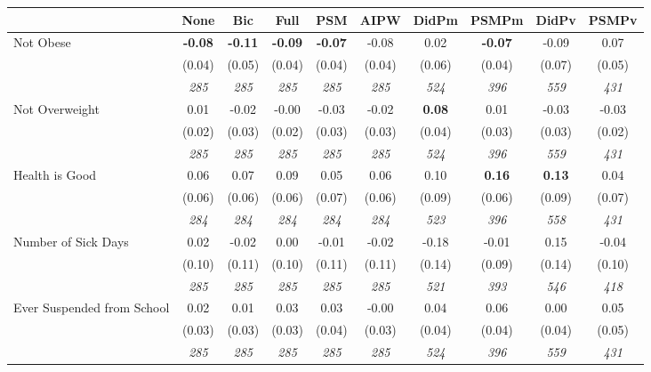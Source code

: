 \begin{tabular}{l c c c c c c c c c}
\toprule
 & None & Bic & Full & PSM & AIPW & DidPm & PSMPm & DidPv & PSMPv \\
\midrule
Not Obese & \textbf{ -0.08 } & \textbf{ -0.11 } & \textbf{ -0.09 } & \textbf{-0.07} & -0.08 & 0.02 & \textbf{-0.07} & -0.09 & 0.07 \\
& (0.04) & (0.05) & (0.04) & (0.04) & (0.04) & (0.06) & (0.04) & (0.07) & (0.05) \\
& \textit{ 285 } & \textit{ 285 } & \textit{ 285 } & \textit{ 285 } & \textit{ 285 } & \textit{ 524 } & \textit{ 396 } & \textit{ 559 } & \textit{ 431 } \\
Not Overweight & 0.01 & -0.02 & -0.00 & -0.03 & -0.02 & \textbf{ 0.08 } & 0.01 & -0.03 & -0.03 \\
& (0.02) & (0.03) & (0.02) & (0.03) & (0.03) & (0.04) & (0.03) & (0.03) & (0.02) \\
& \textit{ 285 } & \textit{ 285 } & \textit{ 285 } & \textit{ 285 } & \textit{ 285 } & \textit{ 524 } & \textit{ 396 } & \textit{ 559 } & \textit{ 431 } \\
Health is Good & 0.06 & 0.07 & 0.09 & 0.05 & 0.06 & 0.10 & \textbf{0.16} & \textbf{ 0.13 } & 0.04 \\
& (0.06) & (0.06) & (0.06) & (0.07) & (0.06) & (0.09) & (0.06) & (0.09) & (0.07) \\
& \textit{ 284 } & \textit{ 284 } & \textit{ 284 } & \textit{ 284 } & \textit{ 284 } & \textit{ 523 } & \textit{ 396 } & \textit{ 558 } & \textit{ 431 } \\
Number of Sick Days & 0.02 & -0.02 & 0.00 & -0.01 & -0.02 & -0.18 & -0.01 & 0.15 & -0.04 \\
& (0.10) & (0.11) & (0.10) & (0.11) & (0.11) & (0.14) & (0.09) & (0.14) & (0.10) \\
& \textit{ 285 } & \textit{ 285 } & \textit{ 285 } & \textit{ 285 } & \textit{ 285 } & \textit{ 521 } & \textit{ 393 } & \textit{ 546 } & \textit{ 418 } \\
Ever Suspended from School & 0.02 & 0.01 & 0.03 & 0.03 & -0.00 & 0.04 & 0.06 & 0.00 & 0.05 \\
& (0.03) & (0.03) & (0.03) & (0.04) & (0.03) & (0.04) & (0.04) & (0.04) & (0.05) \\
& \textit{ 285 } & \textit{ 285 } & \textit{ 285 } & \textit{ 285 } & \textit{ 285 } & \textit{ 524 } & \textit{ 396 } & \textit{ 559 } & \textit{ 431 } \\
\bottomrule
\end{tabular}
